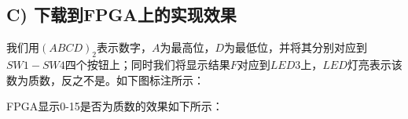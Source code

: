 \documentclass[UTF8]{ctexart}
\begin{document}
\subsection*{ C) 下载到FPGA上的实现效果}
我们用$(ABCD)_2$表示数字，$A$为最高位，$D$为最低位，并将其分别对应到$SW1-SW4$四个按钮上；同时我们将显示结果$F$对应到$LED3$上，$LED$灯亮表示该数为质数，反之不是。如下图标注所示：
\begin{figure}[H]
\end{figure}
FPGA显示0-15是否为质数的效果如下所示：
\end{document}
